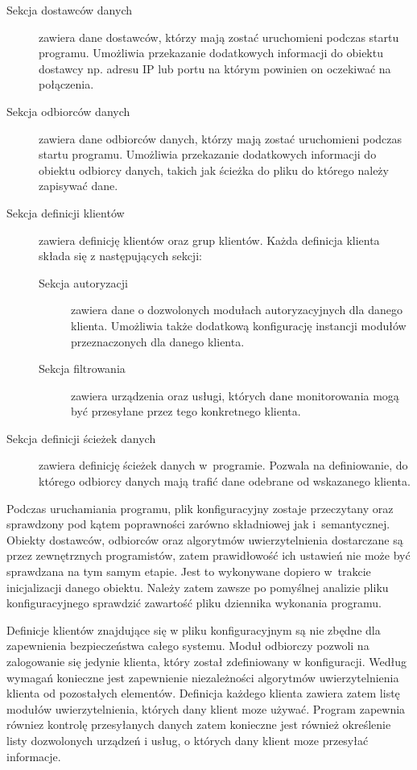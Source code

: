 \begin{description}
\item[Sekcja dostawców danych] zawiera dane dostawców, którzy mają
  zostać uruchomieni podczas startu programu. Umożliwia przekazanie
  dodatkowych informacji do obiektu dostawcy np. adresu IP lub portu
  na którym powinien on oczekiwać na połączenia. 
\item[Sekcja odbiorców danych] zawiera dane odbiorców danych, którzy
  mają zostać uruchomieni podczas startu programu. Umożliwia
  przekazanie dodatkowych informacji do obiektu odbiorcy danych,
  takich jak ścieżka do pliku do którego należy zapisywać dane. 
\item[Sekcja definicji klientów] zawiera definicję klientów oraz grup
  klientów. Każda definicja klienta składa się z następujących sekcji:
  \begin{description}
  \item[Sekcja autoryzacji] zawiera dane o dozwolonych modułach
    autoryzacyjnych dla danego klienta. Umożliwia także dodatkową
    konfigurację instancji modułów przeznaczonych dla danego klienta.
  \item[Sekcja filtrowania] zawiera urządzenia oraz usługi, których
    dane monitorowania mogą być przesyłane przez tego konkretnego
    klienta.
  \end{description}
\item[Sekcja definicji ścieżek danych] zawiera definicję ścieżek
  danych w~programie. Pozwala na definiowanie, do którego odbiorcy
  danych mają trafić dane odebrane od wskazanego klienta.
\end{description}

Podczas uruchamiania programu, plik konfiguracyjny zostaje przeczytany
oraz sprawdzony pod kątem poprawności zarówno składniowej jak
i~semantycznej. Obiekty dostawców, odbiorców oraz algorytmów
uwierzytelnienia dostarczane są przez zewnętrznych programistów, zatem
prawidłowość ich ustawień nie może być sprawdzana na tym samym
etapie. Jest to wykonywane dopiero w~trakcie inicjalizacji danego
obiektu. Należy zatem zawsze po pomyślnej analizie pliku
konfiguracyjnego sprawdzić zawartość pliku dziennika wykonania
programu. 

Definicje klientów znajdujące się w pliku konfiguracyjnym są
nie zbędne dla zapewnienia bezpieczeństwa całego systemu. Moduł
odbiorczy pozwoli na zalogowanie się jedynie klienta, który został
zdefiniowany w konfiguracji. Według wymagań konieczne jest zapewnienie
niezależności algorytmów uwierzytelnienia klienta od pozostałych
elementów. Definicja każdego klienta zawiera zatem listę modułów
uwierzytelnienia, których dany klient moze używać. Program zapewnia
równiez kontrolę przesyłanych danych zatem konieczne jest również
określenie listy dozwolonych urządzeń i usług, o których dany klient
moze przesyłać informacje.

